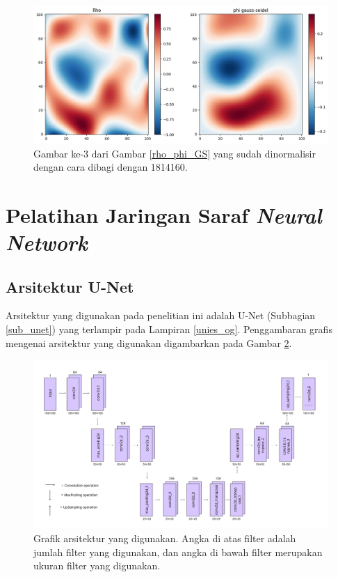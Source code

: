 \begin{figure}[h!]
    \centering
    \includegraphics[width=12cm]{gambar/rho_phi_GS_1814160.png}
    \caption{Gambar ke-3 dari Gambar \ref{rho_phi_GS} yang sudah dinormalisir dengan cara dibagi dengan 1814160.}
    \label{rho_phi_GS_1814160}
\end{figure}

\section{Pelatihan Jaringan Saraf \textit{Neural Network}}

\subsection{Arsitektur U-Net}
Arsitektur yang digunakan pada penelitian ini adalah U-Net (Subbagian \ref{sub_unet}) yang terlampir pada Lampiran \ref{unies_og}. Penggambaran grafis mengenai arsitektur yang digunakan digambarkan pada Gambar \ref{arsitektur_unies}.

\begin{figure}[h!]
    \centering
    \includegraphics[width=14cm]{gambar/unies_og.png}
    \caption{Grafik arsitektur yang digunakan. Angka di atas filter adalah jumlah filter yang digunakan, dan angka di bawah filter merupakan ukuran filter yang digunakan.}
    \label{arsitektur_unies}
\end{figure}

